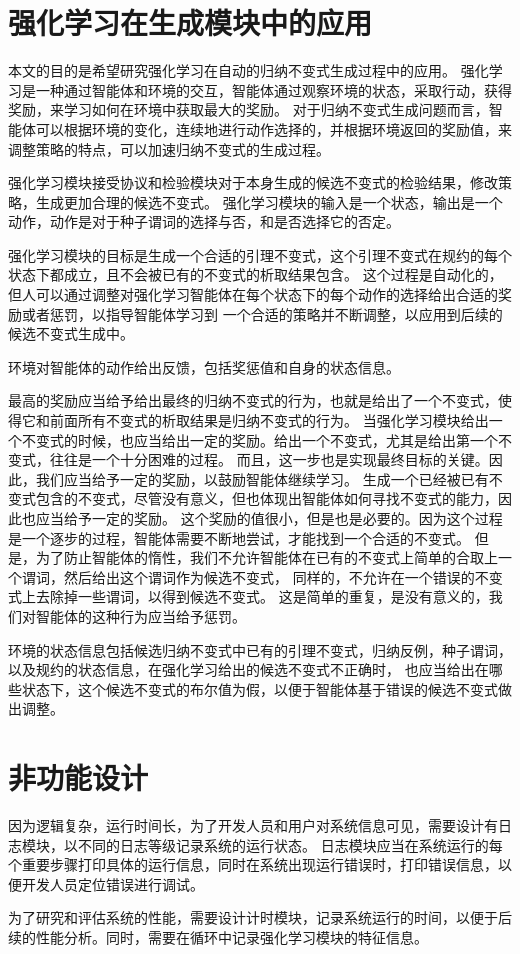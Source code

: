 \section{强化学习在生成模块中的应用}

本文的目的是希望研究强化学习在自动的归纳不变式生成过程中的应用。
强化学习是一种通过智能体和环境的交互，智能体通过观察环境的状态，采取行动，获得奖励，来学习如何在环境中获取最大的奖励。
对于归纳不变式生成问题而言，智能体可以根据环境的变化，连续地进行动作选择的，并根据环境返回的奖励值，来调整策略的特点，可以加速归纳不变式的生成过程。

强化学习模块接受\TLA 协议和检验模块对于本身生成的候选不变式的检验结果，修改策略，生成更加合理的候选不变式。
强化学习模块的输入是一个状态，输出是一个动作，动作是对于种子谓词的选择与否，和是否选择它的否定。

强化学习模块的目标是生成一个合适的引理不变式，这个引理不变式在规约的每个状态下都成立，且不会被已有的不变式的析取结果包含。
这个过程是自动化的，但人可以通过调整对强化学习智能体在每个状态下的每个动作的选择给出合适的奖励或者惩罚，以指导智能体学习到
一个合适的策略并不断调整，以应用到后续的候选不变式生成中。

环境对智能体的动作给出反馈，包括奖惩值和自身的状态信息。

最高的奖励应当给予给出最终的归纳不变式的行为，也就是给出了一个不变式，使得它和前面所有不变式的析取结果是归纳不变式的行为。
当强化学习模块给出一个不变式的时候，也应当给出一定的奖励。给出一个不变式，尤其是给出第一个不变式，往往是一个十分困难的过程。
而且，这一步也是实现最终目标的关键。因此，我们应当给予一定的奖励，以鼓励智能体继续学习。
生成一个已经被已有不变式包含的不变式，尽管没有意义，但也体现出智能体如何寻找不变式的能力，因此也应当给予一定的奖励。
这个奖励的值很小，但是也是必要的。因为这个过程是一个逐步的过程，智能体需要不断地尝试，才能找到一个合适的不变式。
但是，为了防止智能体的惰性，我们不允许智能体在已有的不变式上简单的合取上一个谓词，然后给出这个谓词作为候选不变式，
同样的，不允许在一个错误的不变式上去除掉一些谓词，以得到候选不变式。
这是简单的重复，是没有意义的，我们对智能体的这种行为应当给予惩罚。

环境的状态信息包括候选归纳不变式中已有的引理不变式，归纳反例，种子谓词，以及规约的状态信息，在强化学习给出的候选不变式不正确时，
也应当给出在哪些状态下，这个候选不变式的布尔值为假，以便于智能体基于错误的候选不变式做出调整。

\section{非功能设计}

因为逻辑复杂，运行时间长，为了开发人员和用户对系统信息可见，需要设计有日志模块，以不同的日志等级记录系统的运行状态。
日志模块应当在系统运行的每个重要步骤打印具体的运行信息，同时在系统出现运行错误时，打印错误信息，以便开发人员定位错误进行调试。

为了研究和评估系统的性能，需要设计计时模块，记录系统运行的时间，以便于后续的性能分析。同时，需要在循环中记录强化学习模块的特征信息。
